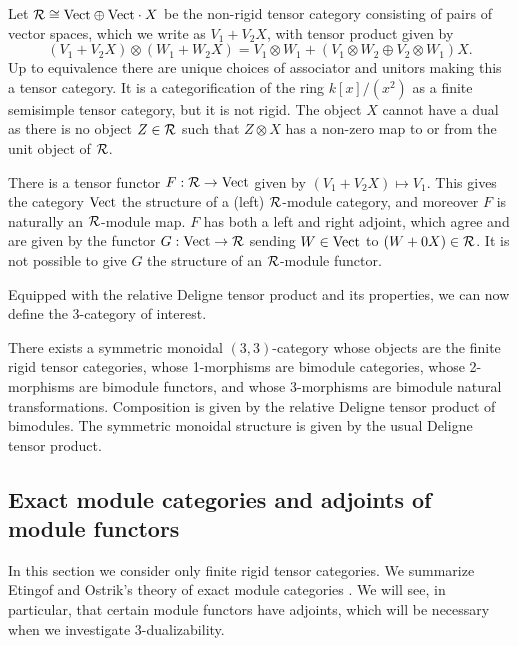 \documentclass{amsart}
\begin{document}
\begin{example} \label{ex:lax-module}

	Let $\mathcal R \cong \mathrm{Vect} \oplus \mathrm{Vect} \cdot X$ be the non-rigid tensor category consisting of pairs of vector spaces, which we write as $V_1 + V_2 X$, with tensor product given by 
	\begin{equation*}
		(V_1 + V_2 X) \otimes (W_1 + W_2 X) = V_1 \otimes W_1  +  (V_1 \otimes W_2 \oplus V_2 \otimes W_1)X.
	\end{equation*} 
	Up to equivalence there are unique choices of associator and unitors making this a tensor category. It is a categorification of the ring $k[x]/(x^2)$ as a finite semisimple tensor category, but it is not rigid. The object $X$ cannot have a dual as there is no object $Z \in \mathcal R$ such that $Z \otimes X$ has a non-zero map to or from the unit object of $\mathcal R$. 
	
	There is a tensor functor $F:\mathcal R \to \mathrm{Vect}$ given by $(V_1 + V_2 X) \mapsto V_1$. This gives the category $\mathrm{Vect}$ the structure of a (left) $\mathcal R$-module category, and moreover $F$ is naturally an $\mathcal R$-module map. $F$ has both a left and right adjoint, which agree and are given by the functor $G: \mathrm{Vect} \to \mathcal R$ sending $W \in \mathrm{Vect}$ to $(W + 0 X) \in \mathcal R$. It is not possible to give $G$ the structure of an $\mathcal R$-module functor. 
\end{example}

Equipped with the relative Deligne tensor product and its properties, we can now define the 3-category of interest.

\begin{theorem}[ \cite{3TC}]
	There exists a symmetric monoidal $(3,3)$-category whose objects are the finite rigid tensor categories, whose 1-morphisms are bimodule categories, whose 2-morphisms are bimodule functors, and whose 3-morphisms are bimodule natural transformations. Composition is given by the relative Deligne tensor product of bimodules. The symmetric monoidal structure is given by the usual Deligne tensor product. 
\end{theorem}

\subsection{Exact module categories and adjoints of module functors} \label{sec:tc-exact}
In this section we consider only finite rigid tensor categories.  We summarize Etingof and Ostrik's theory of exact module categories \cite{MR2119143}.  We will see, in particular, that certain module functors have adjoints, which will be necessary when we investigate $3$-dualizability.
\end{document}
